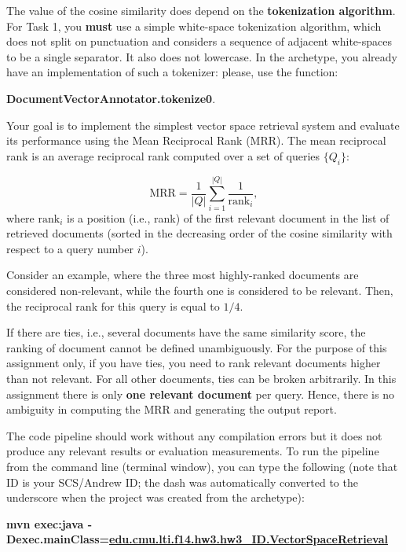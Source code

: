 \documentclass[oneside,11pt]{memoir}
\begin{document}
The value of the cosine similarity does depend on the \textbf{tokenization algorithm}.
For Task 1, you \textbf{must} use a simple white-space tokenization algorithm,
which does not split on punctuation and considers a sequence of 
adjacent white-spaces to be a single separator.
It also  does not lowercase.
In the archetype, you already have an implementation of such a tokenizer:
please, use the function:
\begin{center}
\textbf{DocumentVectorAnnotator.tokenize0}.
\end{center}

Your goal is to implement the simplest vector space retrieval system
and evaluate its performance using the Mean Reciprocal Rank (MRR).  
The mean reciprocal rank is an average reciprocal rank
computed over a set of queries $\{Q_i\}$:

\begin{equation}\label{EqMRR}
\mbox{MRR} = \frac{1}{|Q|}\sum\limits_{i=1}^{|Q|} \frac{1} {\mbox{rank}_i},
\end{equation}
where $\mbox{rank}_i$ is a position (i.e., rank) of the first relevant document
in the list of retrieved documents (sorted in the decreasing order of the cosine similarity with respect to a query number $i$).

Consider an example, where the three most highly-ranked documents are considered 
non-relevant, while the fourth one is considered to be relevant. 
Then, the reciprocal rank for this query is equal to $1/4$.

If there are ties, i.e., several documents have the same
similarity score,
the ranking of document cannot be defined unambiguously.
For the purpose of this assignment only, if you have ties,
you need to rank relevant documents higher than not relevant. 
For all other documents, ties can be broken arbitrarily.
In this assignment there is only \textbf{one relevant document} per query.
Hence, there is no ambiguity in computing the MRR and generating the output report.


The code pipeline should work without any compilation errors but it does not produce any relevant results or evaluation measurements.
To run the pipeline from the command line (terminal window), you can type the following
(note that ID is your SCS/Andrew ID; the dash was automatically converted to the underscore when the project was created from the archetype):

\begin{center}\small\textbf{mvn exec:java 
       -Dexec.mainClass=\url{edu.cmu.lti.f14.hw3.hw3_ID.VectorSpaceRetrieval}}\end{center}
\end{document}
